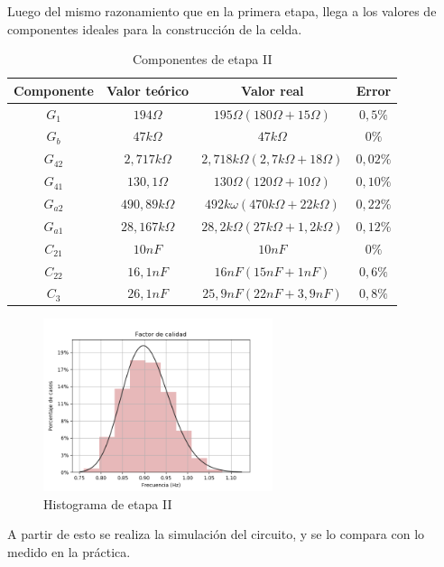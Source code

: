 Luego del mismo razonamiento que en la primera etapa, llega a los valores de componentes ideales para la construcci\'on de la celda.


\begin{table}[H]
    \centering
    \begin{tabular}{c c c c}
        Componente & Valor te\'orico & Valor real & Error\\
        \hline
         $G_1$ & $194\Omega$ & $195\Omega (180\Omega + 15\Omega)$ & $0,5\%$ \\
	     $G_b$ & $47k\Omega$ & $47k\Omega$ & $0\%$ \\
         $G_{42}$ & $2,717k\Omega$ & $2,718k\Omega (2,7k\Omega + 18\Omega)$ & $0,02\%$ \\
         $G_{41}$ & $130,1\Omega$ & $130\Omega (120\Omega+10\Omega)$ & $0,10\%$ \\
         $G_{a2}$ & $490,89k\Omega$ & $492k\omega (470k\Omega+22k\Omega)$ & $0,22\%$ \\
	     $G_{a1}$ & $28,167k\Omega$ & $28,2k\Omega (27k\Omega + 1,2k\Omega)$ & $0,12\%$ \\
         $C_{21}$ & $10nF$ & $10nF$ & $0\%$ \\
         $C_{22}$ & $16,1nF$ & $16nF (15nF + 1nF)$ & $0,6\%$ \\
         $C_3$ & $26,1nF$ & $25,9nF (22nF + 3,9nF)$ & $0,8\%$ \\
    \end{tabular}
    \caption{Componentes de etapa II}
    \label{tabla_stageII_comp}
\end{table}

\begin{figure}[H]
    \centering
    \includegraphics[width=0.6\textwidth]{../EJ3/Resources/histograma_stageii.png}
    \caption{Histograma de etapa II}
     \label{EJ3_STAGEII_HIST}
\end{figure}

A partir de esto se realiza la simulaci\'on del circuito, y se lo compara con lo medido en la pr\'actica.

